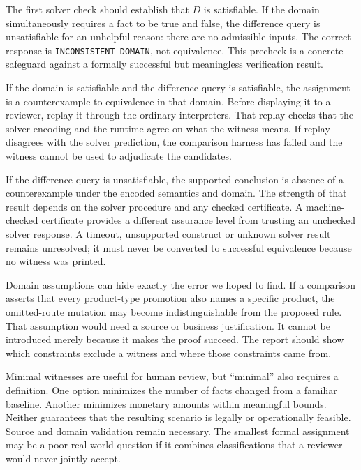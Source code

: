 The first solver check should establish that $D$ is satisfiable. If the domain
simultaneously requires a fact to be true and false, the difference query is
unsatisfiable for an unhelpful reason: there are no admissible inputs. The
correct response is \texttt{INCONSISTENT\_DOMAIN}, not equivalence. This
precheck is a concrete safeguard against a formally successful but meaningless
verification result.

If the domain is satisfiable and the difference query is satisfiable, the
assignment is a counterexample to equivalence in that domain. Before displaying
it to a reviewer, replay it through the ordinary interpreters. That replay
checks that the solver encoding and the runtime agree on what the witness
means. If replay disagrees with the solver prediction, the comparison harness
has failed and the witness cannot be used to adjudicate the candidates.


If the difference query is unsatisfiable, the supported conclusion is absence
of a counterexample under the encoded semantics and domain. The strength of
that result depends on the solver procedure and any checked certificate. A
machine-checked certificate provides a different assurance level from trusting
an unchecked solver response. A timeout, unsupported construct or unknown
solver result remains unresolved; it must never be converted to successful
equivalence because no witness was printed.

Domain assumptions can hide exactly the error we hoped to find. If a comparison
asserts that every product-type promotion also names a specific product, the
omitted-route mutation may become indistinguishable from the proposed rule.
That assumption would need a source or business justification. It cannot be
introduced merely because it makes the proof succeed. The report should show
which constraints exclude a witness and where those constraints came from.

Minimal witnesses are useful for human review, but ``minimal'' also requires a
definition. One option minimizes the number of facts changed from a familiar
baseline. Another minimizes monetary amounts within meaningful bounds. Neither
guarantees that the resulting scenario is legally or operationally feasible.
Source and domain validation remain necessary. The smallest formal assignment
may be a poor real-world question if it combines classifications that a reviewer
would never jointly accept.


